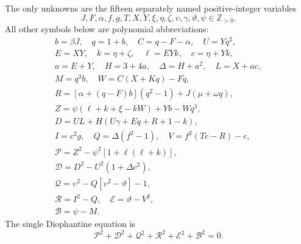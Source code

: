 The only unknowns are the fifteen separately named positive-integer variables
\[
J,F,\alpha,f,g,T,X,Y,\xi,\eta,\zeta,\upsilon,\gamma,\vartheta,\psi\in\mathbb Z_{>0}.
\]
All other symbols below are polynomial abbreviations:
\[
\begin{gathered}
b=\beta J,\quad q=1+b,\quad C=q-F-\alpha,\quad U=Yq^2,\\
E=XY,\quad k=\eta+\zeta,\quad \ell=EYk,\quad c=\eta+Yk,\\
a=E+Y,\quad H=3+4a,\quad\Delta=H+a^2,\quad L=X+ac,\\
M=q^3b,\quad W=C(X+Kq)-Fq,\\
R=[\alpha+(q-F)b](q^2-1)+J(\mu+\omega q),\\
Z=\psi(\ell+k+\xi-kW)+Yb-Wq^3,\\
D=UL+H(U\gamma+Eq+R+1-k),\\
I=c^2g,\quad Q=\Delta(f^2-1),\quad V=f^2(Tc-R)-c,\\
\mathcal{P}=Z^2-\psi^2[1+\ell(\ell+k)],\\
\mathcal{D}=D^2-U^2(1+\Delta c^2),\\
\mathcal{Q}=\upsilon^2-Q[\upsilon^2-\vartheta]-1,\\
\mathcal{R}=I^2-Q,\quad \mathcal{E}=\vartheta-V^2,\\
\mathcal{B}=\psi-M.
\end{gathered}
\]
The single Diophantine equation is
\[
\boxed{\mathcal{P}^2+\mathcal{D}^2+\mathcal{Q}^2+\mathcal{R}^2+\mathcal{E}^2+\mathcal{B}^2=0.}
\]
